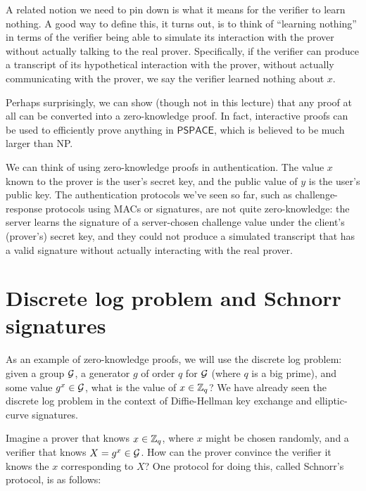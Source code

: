 A related notion we need to pin down is what it means for the verifier to
learn nothing.  A good way to define this, it turns out, is to think of
``learning nothing'' in terms of the verifier being able to simulate its
interaction with the prover without actually talking to the real prover.
Specifically, if the verifier can produce a transcript of its hypothetical
interaction with the prover, without actually communicating with the
prover, we say the verifier learned nothing about $x$.

Perhaps surprisingly, we can show (though not in this lecture)
that any proof at all can be converted into a zero-knowledge proof.
In fact, interactive proofs can be used to efficiently prove anything
in $\mathsf{PSPACE}$, which is believed to be much larger than NP.

We can think of using zero-knowledge proofs in authentication.  The value
$x$ known to the prover is the user's secret key, and the public value of
$y$ is the user's public key.  The authentication protocols we've seen
so far, such as challenge-response protocols using MACs or signatures,
are not quite zero-knowledge: the server learns the signature of a
server-chosen challenge value under the client's (prover's) secret key,
and they could not produce a simulated transcript that has a valid
signature without actually interacting with the real prover.


\section{Discrete log problem and Schnorr signatures}

As an example of zero-knowledge proofs, we will use the discrete log
problem: given a group $\mathcal{G}$, a generator $g$ of order $q$ for $\mathcal{G}$
(where $q$ is a big prime), and some value $g^x\in \mathcal{G}$, what is the
value of $x\in \mathbb{Z}_q$?  We have already seen the discrete log problem in
the context of Diffie-Hellman key exchange and elliptic-curve signatures.

Imagine a prover that knows $x\in \mathbb{Z}_q$, where $x$ might be chosen randomly,
and a verifier that knows $X = g^x\in \mathcal{G}$.  How can the prover convince
the verifier it knows the $x$ corresponding to $X$?  One protocol for doing
this, called Schnorr's protocol, is as follows:

